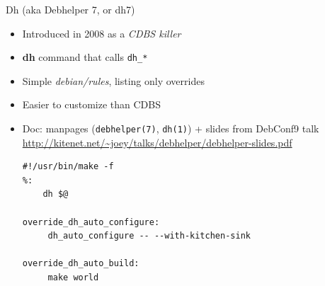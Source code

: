 \documentclass[10pt,final]{beamer}
\begin{document}
\begin{frame}[fragile]{Dh (aka Debhelper 7, or dh7)}
  \begin{itemize}
  \item Introduced in 2008 as a \textsl{CDBS killer}
    \hbr
  \item \textbf{dh} command that calls \texttt{dh\_*}
    \hbr
  \item Simple \textsl{debian/rules}, listing only overrides
    \hbr
  \item Easier to customize than CDBS
    \hbr
  \item Doc: manpages (\texttt{debhelper(7)}, \texttt{dh(1)}) + slides from DebConf9 talk\\
    \url{http://kitenet.net/~joey/talks/debhelper/debhelper-slides.pdf}
    \br
    \begin{lstlisting}[basicstyle=\ttfamily\footnotesize]
#!/usr/bin/make -f
%:
    dh $@

override_dh_auto_configure:
     dh_auto_configure -- --with-kitchen-sink

override_dh_auto_build:
     make world

    \end{lstlisting}
  \end{itemize} %
\end{frame}
\end{document}
